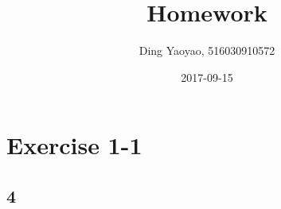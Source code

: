 \documentclass{article}
\title{Homework}
\date{2017-09-15}
\author{Ding Yaoyao, 516030910572}
\begin{document}
	\maketitle

	\section*{Exercise 1-1}

		\subsection*{4}
\end{document}
